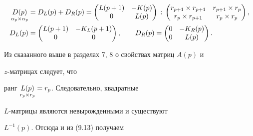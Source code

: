 \begin{equation} 


\begin{split} 


\down{\alpha_p\times\alpha_p}{D(p)}&=D_L(p)+D_R(p)= 


\begin{pmatrix} 


L(p+1) & -K(p) \\ 0 & L(p) 


\end{pmatrix} 


\,:\, 


\begin{pmatrix} 


r_{p+1}\times r_{p+1} & r_{p+1}\times r_p \\ 


r_p\times r_{p+1} & r_p\times r_p 


\end{pmatrix} 


, \\ 


D_L(p)&= 


\begin{pmatrix} 


L(p+1) & -K_L(p+1) \\ 0 & 0 


\end{pmatrix} 


,\qquad D_R(p)= 


\begin{pmatrix} 


0 & -K_R(p) \\ 0 & L(p) 


\end{pmatrix} 


. 


\end{split} 


\end{equation} 


Из сказанного выше в разделах 7, 8 о свойствах матриц $A(p)$ и 


$z$-матрицах следует, что  


ранг $\underset{r_p\times r_p}{L(p)}{}=r_p$. Следовательно, квадратные 


$L$-матрицы являются невырожденными и существуют  


$L^{-1}(p)$. Отсюда и из (9.13) получаем 


 


